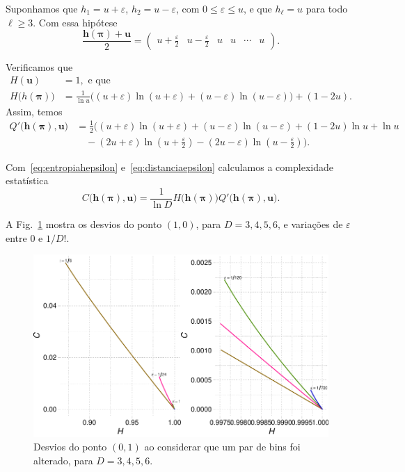 \documentclass[10pt]{article}
\begin{document}
Suponhamos que $h_1=u+\varepsilon$, $h_2=u-\varepsilon$, com $0\leq\varepsilon\leq u$, e que $h_\ell=u$ para todo $\ell\geq 3$.
Com essa hipótese
\begin{equation}
	\frac{\bm h(\bm \pi) + \bm u}{2} =
	\begin{pmatrix}
	u+\frac{\varepsilon}{2}
	& u-\frac{\varepsilon}{2}
	& u
	& u
	& \cdots
	& u
	\end{pmatrix} .
	\label{hu2}
\end{equation}

Verificamos que
\begin{align}
	H(\bm u) &= 1, \text{ e que}\\
	H\big(h(\bm \pi)\big) & = 
\frac{1}{\ln u} \big(	(u+\varepsilon ) \ln (u+\varepsilon )
	+ (u-\varepsilon ) \ln (u-\varepsilon )\big) +
	(1-2u) . 
	\label{eq:entropiahepsilon}
\end{align}
Assim, temos
\begin{equation}
\begin{split}
Q'\big(\bm h(\bm \pi), \bm u\big) & =
\frac{1}{2} \Bigg(
(u+\varepsilon ) \ln (u+\varepsilon )
+(u-\varepsilon ) \ln (u-\varepsilon )
+(1-2 u) \ln u
+\ln u\\
& \quad\mbox{}
- (2 u+\varepsilon ) \ln\left(u+\frac{\varepsilon }{2}\right)
-(2 u-\varepsilon) \ln \left(u-\frac{\varepsilon }{2}\right)  
\Bigg)	.
\end{split}
\label{eq:distanciaepsilon}
\end{equation}

Com~\eqref{eq:entropiahepsilon} e~\eqref{eq:distanciaepsilon} calculamos a complexidade estatística
\begin{equation}
	C\big(\bm h(\bm \pi), \bm u\big) = \frac{1}{\ln D}H\big(\bm h(\bm \pi)\big) Q'\big(\bm{h}(\bm \pi), \bm{u}\big).
	\label{eq:complexidade}
\end{equation}

A Fig.~\ref{fig:Deviations} mostra os desvios do ponto $(1,0)$, para $D=3,4,5,6$, e variações de $\varepsilon$ entre $0$ e $1/D!$.

\begin{figure}[hbt]
\includegraphics[width=\linewidth]{Deviations}
\caption{Desvios do ponto $(0,1)$ ao considerar que um par de bins foi alterado, para $D=3,4,5,6$.}
\label{fig:Deviations}
\end{figure}



\end{document}
